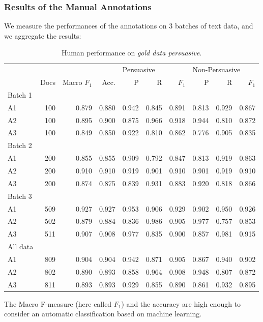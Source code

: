 \subsubsection{Results of the Manual Annotations}
We measure the performances of the annotations on 3 batches of text data, and we aggregate the results:
\begin{table}[H]
\begin{tabular}{lrrr|rrr|rrr}
	&	&	&	& \multicolumn{3}{l}{Persuasive} & \multicolumn{3}{l}{Non-Persuasive} \\
	& Docs	& Macro $F_1$ & Acc. & P & R	& $F_1$ & P & R & $F_1$ \\ \hline
Batch 1	&	&	&	&	&	&	&	&	&\\
A1	&100	&0.879	&0.880	&0.942	&0.845	&0.891	&0.813	&0.929	&0.867\\
A2	&100	&0.895	&0.900	&0.875	&0.966	&0.918	&0.944	&0.810	&0.872\\
A3	&100	&0.849	&0.850	&0.922	&0.810	&0.862	&0.776	&0.905	&0.835\\ \hline
Batch 2	&	&	&	&	&	&	&	&	&\\
A1	&200	&0.855	&0.855	&0.909	&0.792	&0.847	&0.813	&0.919	&0.863\\
A2	&200	&0.910	&0.910	&0.919	&0.901	&0.910	&0.901	&0.919	&0.910\\
A3	&200	&0.874	&0.875	&0.839	&0.931	&0.883	&0.920	&0.818	&0.866\\ \hline
Batch 3	&	&	&	&	&	&	&	&	&\\
A1	&509	&0.927	&0.927	&0.953	&0.906	&0.929	&0.902	&0.950	&0.926\\
A2	&502	&0.879	&0.884	&0.836	&0.986	&0.905	&0.977	&0.757	&0.853\\
A3	&511	&0.907	&0.908	&0.977	&0.835	&0.900	&0.857	&0.981	&0.915\\ \hline
All data	&	&	&	&	&	&	&	&	&\\
A1	&809	&0.904	&0.904	&0.942	&0.871	&0.905	&0.867	&0.940	&0.902\\
A2	&802	&0.890	&0.893	&0.858	&0.964	&0.908	&0.948	&0.807	&0.872\\
A3	&811	&0.893	&0.893	&0.929	&0.855	&0.890	&0.861	&0.932	&0.895\\
\end{tabular}
\caption{\label{tab:human-performance-annotation-study-1} Human performance on \emph{gold data persuasive}.}
\end{table}
The Macro F-measure (here called $F_1$) and the accuracy are high enough to consider an automatic classification based on machine learning.

